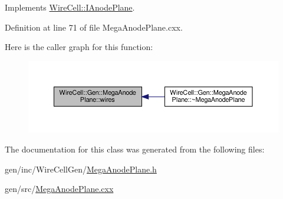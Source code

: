 Implements \hyperlink{class_wire_cell_1_1_i_anode_plane_a58f3e7e47cfe10a141e0275f80dcc789}{Wire\+Cell\+::\+I\+Anode\+Plane}.



Definition at line 71 of file Mega\+Anode\+Plane.\+cxx.

Here is the caller graph for this function\+:
\nopagebreak
\begin{figure}[H]
\begin{center}
\leavevmode
\includegraphics[width=350pt]{class_wire_cell_1_1_gen_1_1_mega_anode_plane_a1d4b6dd24d9b2d805120eed53e153bc3_icgraph}
\end{center}
\end{figure}


The documentation for this class was generated from the following files\+:\begin{DoxyCompactItemize}
\item 
gen/inc/\+Wire\+Cell\+Gen/\hyperlink{_mega_anode_plane_8h}{Mega\+Anode\+Plane.\+h}\item 
gen/src/\hyperlink{_mega_anode_plane_8cxx}{Mega\+Anode\+Plane.\+cxx}\end{DoxyCompactItemize}
